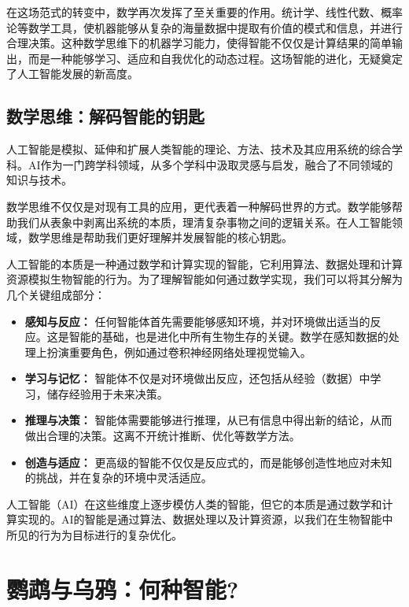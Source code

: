 在这场范式的转变中，数学再次发挥了至关重要的作用。统计学、线性代数、概率论等数学工具，使机器能够从复杂的海量数据中提取有价值的模式和信息，并进行合理决策。这种数学思维下的机器学习能力，使得智能不仅仅是计算结果的简单输出，而是一种能够学习、适应和自我优化的动态过程。这场智能的进化，无疑奠定了人工智能发展的新高度。

\subsection*{数学思维：解码智能的钥匙}

人工智能是模拟、延伸和扩展人类智能的理论、方法、技术及其应用系统的综合学科。AI作为一门跨学科领域，从多个学科中汲取灵感与启发，融合了不同领域的知识与技术。

数学思维不仅仅是对现有工具的应用，更代表着一种解码世界的方式。数学能够帮助我们从表象中剥离出系统的本质，理清复杂事物之间的逻辑关系。在人工智能领域，数学思维是帮助我们更好理解并发展智能的核心钥匙。

人工智能的本质是一种通过数学和计算实现的智能，它利用算法、数据处理和计算资源模拟生物智能的行为。为了理解智能如何通过数学实现，我们可以将其分解为几个关键组成部分：

\begin{itemize}
\item {\bf 感知与反应：} 任何智能体首先需要能够感知环境，并对环境做出适当的反应。这是智能的基础，也是进化中所有生物生存的关键。数学在感知数据的处理上扮演重要角色，例如通过卷积神经网络处理视觉输入。

\item  {\bf 学习与记忆：} 智能体不仅是对环境做出反应，还包括从经验（数据）中学习，储存经验用于未来决策。

\item  {\bf 推理与决策：} 智能体需要能够进行推理，从已有信息中得出新的结论，从而做出合理的决策。这离不开统计推断、优化等数学方法。

\item  {\bf 创造与适应：} 更高级的智能不仅仅是反应式的，而是能够创造性地应对未知的挑战，并在复杂的环境中灵活适应。
\end{itemize}

人工智能（AI）在这些维度上逐步模仿人类的智能，但它的本质是通过数学和计算实现的。AI的智能是通过算法、数据处理以及计算资源，以我们在生物智能中所见的行为为目标进行的复杂优化。

\section{鹦鹉与乌鸦：何种智能?}

